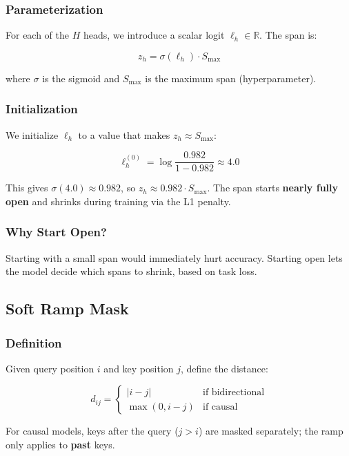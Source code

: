 \subsubsection{Parameterization}

For each of the $H$ heads, we introduce a scalar logit $\ell_h \in \mathbb{R}$. 
The span is:

\[
z_h = \sigma(\ell_h) \cdot S_\text{max}
\]

where $\sigma$ is the sigmoid and $S_\text{max}$ is the maximum span 
(hyperparameter).

\subsubsection{Initialization}

We initialize $\ell_h$ to a value that makes $z_h \approx S_\text{max}$:

\[
\ell_h^{(0)} = \log \frac{0.982}{1 - 0.982} \approx 4.0
\]

This gives $\sigma(4.0) \approx 0.982$, so $z_h \approx 0.982 \cdot S_\text{max}$. 
The span starts \textbf{nearly fully open} and shrinks during training via the 
L1 penalty.

\subsubsection{Why Start Open?}

Starting with a small span would immediately hurt accuracy. Starting open 
lets the model decide which spans to shrink, based on task loss.

\subsection{Soft Ramp Mask}

\subsubsection{Definition}

Given query position $i$ and key position $j$, define the distance:

\[
d_{ij} = \begin{cases} |i - j| & \text{if bidirectional} \\ \max(0, i - j) & \text{if causal} \end{cases}
\]

For causal models, keys after the query ($j > i$) are masked separately; 
the ramp only applies to \textbf{past} keys.

